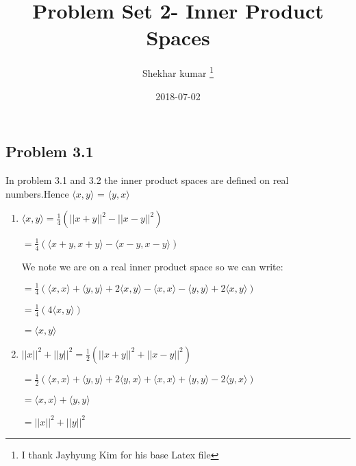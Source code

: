 \documentclass[letterpaper,12pt]{article}
\theoremstyle{definition}
\begin{document}
	
	\title{Problem Set 2- Inner Product Spaces\\
	}
	\author{
		Shekhar kumar \footnote{I thank Jayhyung Kim for his base Latex file}\\[-2pt]
	}
	\date{2018-07-02}
	\vspace{-9mm}
	\maketitle
	\thispagestyle{empty}
	
	\pagestyle{fancy}
	\fancyhf{}
	\cfoot{\thepage}
	
	\begin{spacing}{1.3}{}
		\vspace{1 mm}
	
\subsection*{Problem 3.1}

	In problem 3.1 and 3.2 the inner product spaces are defined on real numbers.Hence $\langle x, y \rangle$ = 	$\langle y, x \rangle $

\begin{enumerate}
  \item 
  

	$\langle x, y \rangle = \frac{1}{4}(||x + y||^2 - ||x - y||^2)$
	
	$= \frac{1}{4}(\langle x + y, x + y \rangle - \langle x - y, x - y \rangle)$
	
	We note we are on a real inner product space so we can write:
	
	$= \frac{1}{4}(\langle x, x \rangle + \langle y, y \rangle + 2\langle x, y \rangle - \langle x, x \rangle - \langle y, y \rangle + 2\langle x, y \rangle)$
	
	$= \frac{1}{4}(4\langle x, y \rangle)$
	
	$= \langle x, y \rangle$
  \item 
  	$||x||^2 + ||y||^2 = \frac{1}{2}(||x + y||^2 + ||x - y||^2)$
	
	$= \frac{1}{2}(\langle x, x \rangle + \langle y, y \rangle + 2\langle y, x \rangle + \langle x, x \rangle + \langle y, y \rangle - 2\langle y, x \rangle)$
	
	$= \langle x, x \rangle + \langle y, y \rangle$
	
	$= ||x||^2 + ||y||^2$
	
	\setlength{\leftskip}{0pt}
\end{enumerate}	


\end{spacing}
\end{document}
